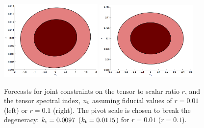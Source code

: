 \begin{figure}[htbp!]
\centering
\includegraphics[width=0.45\textwidth]{Inflation/r_nt_r01_kt0097.png}
\includegraphics[width=0.45\textwidth]{Inflation/r_nt_r1_kt0115.png}
\caption{ Forecasts for joint constraints on the tensor to scalar ratio $r$, and the tensor spectral index, $n_{\rm t}$ assuming fiducial values of $r=0.01$ (left) or $r=0.1$ (right). The pivot scale is chosen to break the degeneracy: $k_{\rm t}=0.0097$ ($k_{\rm t}=0.0115$) for $r=0.01$ ($r=0.1$).}
\label{fig:rnT}
\end{figure}


